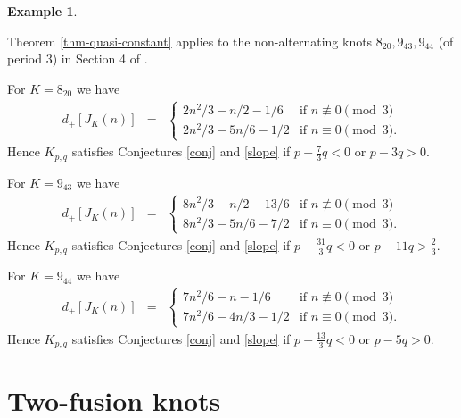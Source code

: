 \documentclass[11pt]{amsart}
\numberwithin{equation}{section}
\theoremstyle{plain}
\theoremstyle{definition}
\newtheorem{example}[theorem]{Example}
\begin{document}
\begin{example}  

\label{3-knots}

 Theorem \ref{thm-quasi-constant} applies to the non-alternating knots $8_{20}, 9_{43}, 9_{44}$ (of period $3$) in Section 4 of \cite{Ga-slope}. 
 
 For $K=8_{20}$ we have
 \begin{eqnarray*}
d_+[J_K(n)] &=& \begin{cases} 2n^2/3 - n/2 - 1/6 &\mbox{if } n \not\equiv 0 \pmod{3}\\ 
2n^2/3 - 5n/6 -1/2 & \mbox{if } n \equiv 0 \pmod{3}.\end{cases} 
\end{eqnarray*}
Hence $K_{p,q}$ satisfies Conjectures \ref{conj}  and  \ref{slope} if $p-\frac{7}{3}q<0$ or $p-3q > 0$.

For $K=9_{43}$ we have
 \begin{eqnarray*}
d_+[J_K(n)] &=& \begin{cases} 8n^2/3 - n/2 - 13/6 &\mbox{if } n \not\equiv 0 \pmod{3}\\ 
8n^2/3 - 5n/6 -7/2 & \mbox{if } n \equiv 0 \pmod{3}.\end{cases}
\end{eqnarray*}
Hence $K_{p,q}$ satisfies Conjectures \ref{conj}  and  \ref{slope} if $p-\frac{31}{3}q<0$ or $p - 11q>\frac{2}{3}$.

For $K=9_{44}$ we have
\begin{eqnarray*}
d_+[J_K(n)] &=& \begin{cases} 7n^2/6 - n - 1/6 &\mbox{if } n \not\equiv 0 \pmod{3}\\ 
7n^2/6 - 4n/3 -1/2 & \mbox{if } n \equiv 0 \pmod{3}.\end{cases}
\end{eqnarray*}
Hence $K_{p,q}$ satisfies Conjectures \ref{conj}  and  \ref{slope} if $p-\frac{13}{3}q<0$ or $p - 5q > 0 $.
\end{example}

 




\section{Two-fusion knots}
\end{document}
